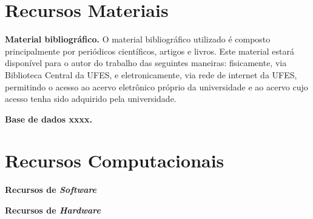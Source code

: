 \section{Recursos Materiais}

\textbf{Material bibliográfico.} O material bibliográfico utilizado é composto principalmente por periódicos científicos, artigos e livros. Este material estará disponível para o autor do trabalho das seguintes maneiras: fisicamente, via Biblioteca Central da UFES, e eletronicamente, via rede de internet da UFES, permitindo o acesso ao acervo eletrônico próprio da universidade e ao acervo cujo acesso tenha sido adquirido pela universidade.

\textbf{Base de dados xxxx.}


\section{Recursos Computacionais}

\textbf{Recursos de \textit{Software}}


\textbf{Recursos de \textit{Hardware}}
